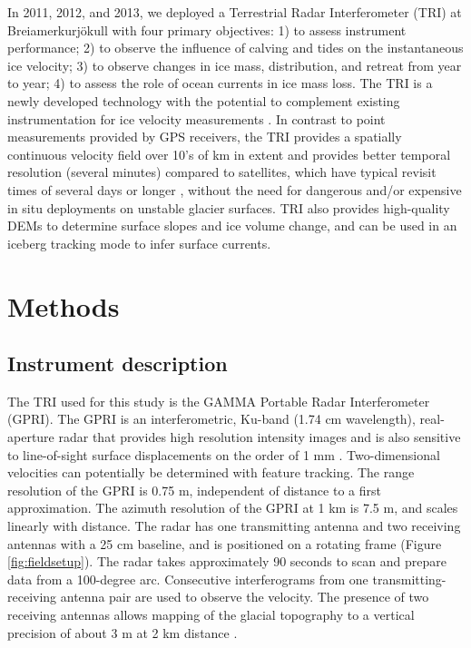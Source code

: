 In 2011, 2012, and 2013, we deployed a Terrestrial Radar Interferometer (TRI) at Brei{\dh}amerkurjökull with four primary objectives: 1) to assess instrument performance; 2) to observe the influence of calving and tides on the instantaneous ice velocity; 3) to observe changes in ice mass, distribution, and retreat from year to year; 4) to assess the role of ocean currents in ice mass loss. The TRI is a newly developed technology with the potential to complement existing instrumentation for ice velocity measurements \citep{riesen2011short}. 
In contrast to point measurements provided by GPS receivers, the TRI provides a spatially continuous velocity field over 10's of km in extent and provides better temporal resolution (several minutes) compared to satellites, which have typical revisit times of several days or longer \citep{covello2010cosmo,werninghaus2010terrasar}, without the need for dangerous and/or expensive in situ deployments on unstable glacier surfaces. TRI also provides high-quality DEMs to determine surface slopes and ice volume change, and can be used in an iceberg tracking mode to infer surface currents. 



\section{Methods}
\subsection{Instrument description}
The TRI used for this study is the GAMMA Portable Radar Interferometer (GPRI). The GPRI is an interferometric, Ku-band (1.74 cm wavelength), real-aperture radar that provides high resolution intensity images and is also sensitive to line-of-sight surface displacements on the order of 1 mm \citep{werner2008real}. Two-dimensional velocities can potentially be determined with feature tracking. 
The range resolution of the GPRI is 0.75 m, independent of distance to a first approximation. The azimuth resolution of the GPRI at 1 km is 7.5 m, and scales linearly with distance. The radar has one transmitting antenna and two receiving antennas with a 25 cm baseline, and is positioned on a rotating frame (Figure \ref{fig:fieldsetup}). The radar takes approximately 90 seconds to scan and prepare data from a 100-degree arc. Consecutive interferograms from one transmitting-receiving antenna pair are used to observe the 
velocity. The presence of two receiving antennas allows mapping of the glacial topography to a 
vertical precision of about 3 m at 2 km distance \citep{strozzi2012topography}. 


